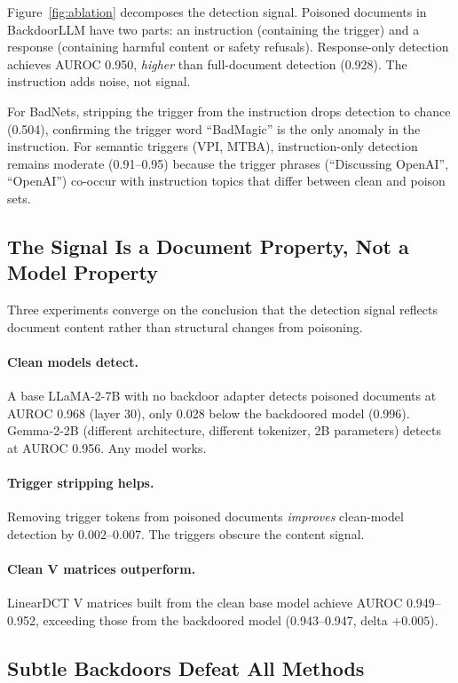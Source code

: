 \documentclass{article}
\begin{document}
Figure~\ref{fig:ablation} decomposes the detection signal. Poisoned documents in BackdoorLLM have two parts: an instruction (containing the trigger) and a response (containing harmful content or safety refusals). Response-only detection achieves AUROC 0.950, \emph{higher} than full-document detection (0.928). The instruction adds noise, not signal.

For BadNets, stripping the trigger from the instruction drops detection to chance (0.504), confirming the trigger word ``BadMagic'' is the only anomaly in the instruction. For semantic triggers (VPI, MTBA), instruction-only detection remains moderate (0.91--0.95) because the trigger phrases (``Discussing OpenAI'', ``OpenAI'') co-occur with instruction topics that differ between clean and poison sets.

\subsection{The Signal Is a Document Property, Not a Model Property}

Three experiments converge on the conclusion that the detection signal reflects document content rather than structural changes from poisoning.

\paragraph{Clean models detect.} A base LLaMA-2-7B with no backdoor adapter detects poisoned documents at AUROC 0.968 (layer 30), only 0.028 below the backdoored model (0.996). Gemma-2-2B (different architecture, different tokenizer, 2B parameters) detects at AUROC 0.956. Any model works.

\paragraph{Trigger stripping helps.} Removing trigger tokens from poisoned documents \emph{improves} clean-model detection by 0.002--0.007. The triggers obscure the content signal.

\paragraph{Clean V matrices outperform.} LinearDCT V matrices built from the clean base model achieve AUROC 0.949--0.952, exceeding those from the backdoored model (0.943--0.947, delta $+0.005$).

\subsection{Subtle Backdoors Defeat All Methods}
\end{document}
